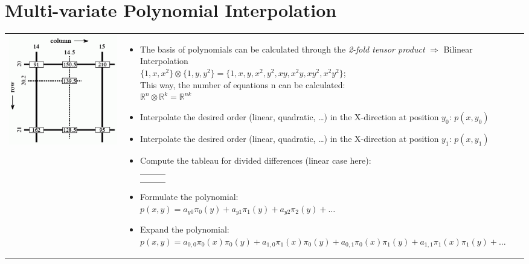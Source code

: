 \section{Multi-variate Polynomial Interpolation}

\begin{tabular}{ll}
  \parbox{6cm}{
    \includegraphics[width=6cm]{./bilder/bilineare_interpolation}
  }
  & \parbox{12.5cm} {
    \begin{itemize}
      \item The basis of polynomials can be calculated through the \emph{2-fold tensor product} $\Rightarrow$ Bilinear Interpolation \\
      $\{1,x,x^2\} \otimes \{1, y, y^2\} = \{1,x,y,x^2,y^2,xy, x^2y, xy^2, x^2y^2\}$; \\
      This way, the number of equations n can be calculated: \\$\mathbb R^n \otimes \mathbb R^k = \mathbb R^{nk}$
      \item Interpolate the desired order (linear, quadratic, \ldots) in the X-direction at position $y_0$: $p(x,y_0)$
      \item Interpolate the desired order (linear, quadratic, \ldots) in the X-direction at position $y_1$: $p(x,y_1)$
      \item Compute the tableau for divided differences (linear case here):\\
        \begin{tabular}{l|ll}
          $y$ & $z$\\
          \hline
          $y_0$ & $p(x,y_0) = a_{y0}$\\
          $y_1$ & $p(x,y_1)$ & $\frac{p(x,y_1) - p(x,y_0)}{y_1-y_0} = a_{y1}$
        \end{tabular}
      \item Formulate the polynomial:\\
        $p(x,y) = a_{y0} \pi_0(y) + a_{y1} \pi_1(y) + a_{y2} \pi_2(y)+\ldots$
      \item Expand the polynomial:\\
          $p(x,y) = a_{0,0} \pi_0(x)\pi_0(y) + a_{1,0} \pi_1(x)\pi_0(y) + a_{0,1} \pi_0(x)\pi_1(y) + a_{1,1} \pi_1(x)\pi_1(y)+\ldots$ 
    \end{itemize}
  }

\end{tabular}

